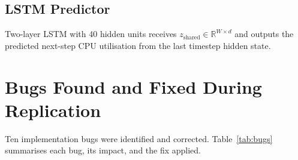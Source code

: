 \documentclass[12pt,a4paper]{article}
\begin{document}
\subsection{LSTM Predictor}

Two-layer LSTM with 40 hidden units receives $z_{\text{shared}} \in \mathbb{R}^{W \times d}$
and outputs the predicted next-step CPU utilisation from the last timestep hidden state.

\section{Bugs Found and Fixed During Replication}

Ten implementation bugs were identified and corrected.
Table~\ref{tab:bugs} summarises each bug, its impact, and the fix applied.
\end{document}
